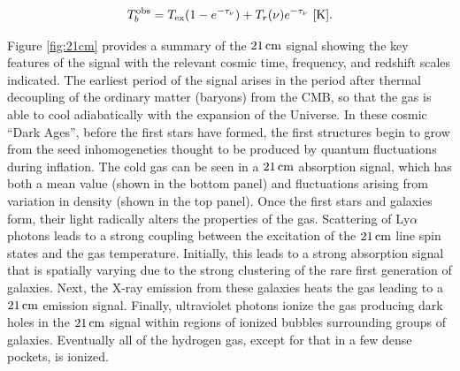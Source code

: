 \documentclass[a4paper,11pt]{article}
\begin{document}
\begin{align*}
    T_b^\mathrm{obs} = T_\mathrm{ex}(1-e^{-\tau_\nu})+T_r(\nu)e^{-\tau_\nu} ~ [{\rm K}].
\end{align*}

{\noindent}Figure \ref{fig:21cm} provides a summary of the $21\,{\rm cm}$ signal showing the key features of the signal with the relevant cosmic time, frequency, and redshift scales indicated. The earliest period of the signal arises in the period after thermal decoupling of the ordinary matter (baryons) from the CMB, so that the gas is able to cool adiabatically with the expansion of the Universe. In these cosmic ``Dark Ages'', before the first stars have formed, the first structures begin to grow from the seed inhomogeneties thought to be produced by quantum fluctuations during inflation. The cold gas can be seen in a $21\,{\rm cm}$ absorption signal, which has both a mean value (shown in the bottom panel) and fluctuations arising from variation in density (shown in the top panel). Once the first stars and galaxies form, their light radically alters the properties of the gas. Scattering of Ly$\alpha$ photons leads to a strong coupling between the excitation of the $21\,{\rm cm}$ line spin states and the gas temperature. Initially, this leads to a strong absorption signal that is spatially varying due to the strong clustering of the rare first generation of galaxies. Next, the X-ray emission from these galaxies heats the gas leading to a $21\,{\rm cm}$ emission signal. Finally, ultraviolet photons ionize the gas producing dark holes in the $21\,{\rm cm}$ signal within regions of ionized bubbles surrounding groups of galaxies. Eventually all of the hydrogen gas, except for that in a few dense pockets, is ionized.
\end{document}
